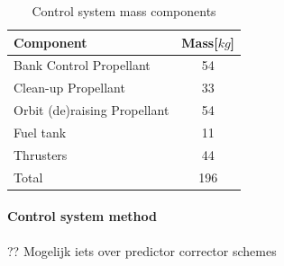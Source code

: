 \begin{table}[h]
\centering
\caption{Control system mass components}
\label{tab:controlmassbreakdown}
\begin{tabular}{|l|c|} \hline
\textbf{Component}                 & \textbf{Mass[$kg$]} \\ \hline
Bank Control Propellant      &     54       \\ \hline
Clean-up Propellant          &     33       \\ \hline
Orbit (de)raising Propellant &     54       \\ \hline
Fuel tank              		 &     11      \\ \hline
Thrusters                	 &     44     \\ \hline \hline
Total                        &     196      \\ \hline
\end{tabular}
\end{table}

\paragraph{Control system method}

?? Mogelijk iets over predictor corrector schemes




